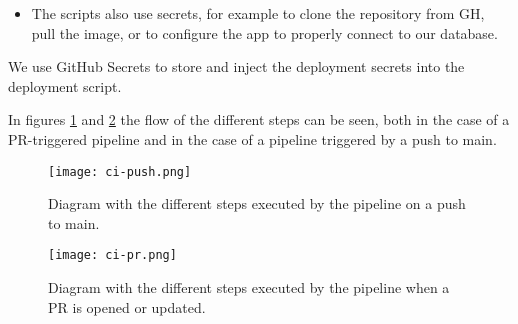 \begin{enumerate}
\begin{itemize}
		      \item The scripts also use secrets, for example to clone the repository from GH, pull the image, or to configure the app to properly connect to our database. %
	      \end{itemize}
\end{enumerate}
We use GitHub Secrets to store and inject the deployment secrets into the deployment script.

In figures \ref{fig:ci-push} and \ref{fig:ci-pr} the flow of the different steps can be seen, both in the case of a PR-triggered pipeline and in the case of a pipeline triggered by a push to main.

\begin{figure}[H]
	\centering
	\texttt{[image: ci-push.png]}
	\caption{Diagram with the different steps executed by the pipeline on a push to main.}
	\label{fig:ci-push}
\end{figure}

\begin{figure}[H]
	\centering
	\texttt{[image: ci-pr.png]}
	\caption{Diagram with the different steps executed by the pipeline when a PR is opened or updated.}
	\label{fig:ci-pr}
\end{figure}
